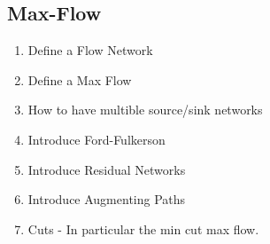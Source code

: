 \subsection{Max-Flow}
\begin{enumerate}
  \item Define a Flow Network
  \item Define a Max Flow
  \item How to have multible source/sink networks
  \item Introduce Ford-Fulkerson
  \item Introduce Residual Networks
  \item Introduce Augmenting Paths
  \item Cuts - In particular the min cut max flow.
\end{enumerate}